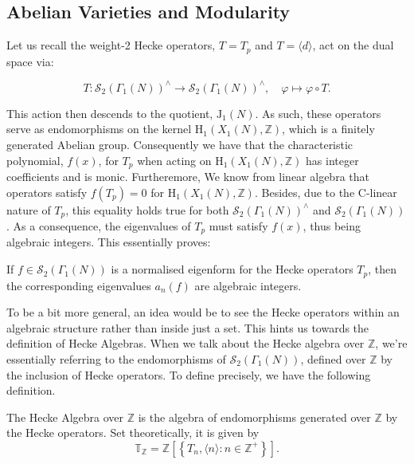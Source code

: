 \subsection{Abelian Varieties and Modularity}

Let us recall the weight-2 Hecke operators, $T=T_{p}$ and $T=\langle d\rangle$, act on the dual space via: 

$$
T: \mathcal{S}_{2}\left(\Gamma_{1}(N)\right)^{\wedge} \longrightarrow \mathcal{S}_{2}\left(\Gamma_{1}(N)\right)^{\wedge}, \quad \varphi \mapsto \varphi \circ T.
$$

This action then descends to the quotient, $\mathrm{J}_{1}(N)$. As such, these operators serve as endomorphisms on the kernel $\mathrm{H}_{1}\left(X_{1}(N), \mathbb{Z}\right)$, which is a finitely generated Abelian group. Consequently we have that the characteristic polynomial, $f(x)$, for $T_{p}$ when acting on $\mathrm{H}_{1}\left(X_{1}(N), \mathbb{Z}\right)$ has integer coefficients and is monic. Furtheremore, We know from linear algebra that operators satisfy $f\left(T_{p}\right)=0$ for $\mathrm{H}_{1}\left(X_{1}(N), \mathbb{Z}\right)$. Besides, due to the C-linear nature of $T_{p}$, this equality holds true for both $\mathcal{S}_{2}\left(\Gamma_{1}(N)\right)^{\wedge}$ and $\mathcal{S}_{2}\left(\Gamma_{1}(N)\right)$.  As a consequence, the eigenvalues of $T_{p}$ must satisfy $f(x)$, thus being algebraic integers. This essentially proves:

\begin{theorem}
    If $f\in \mathcal{S}_{2}\left(\Gamma_{1}(N)\right)$ is a normalised eigenform for the Hecke operators $T_{p}$, then the corresponding eigenvalues $a_{n}(f)$ are algebraic integers.
\end{theorem}

To be a bit more general, an idea would be to see the Hecke operators within an algebraic structure rather than inside just a set. This hints us towards the definition of Hecke Algebras.  When we talk about the Hecke algebra over $\mathbb{Z}$, we're essentially referring to the endomorphisms of $\mathcal{S}_{2}\left(\Gamma_{1}(N)\right)$, defined over $\mathbb{Z}$ by the inclusion of Hecke operators. To define precisely, we have the following definition. 

\begin{definition}
The Hecke Algebra over $\mathbb{Z}$ is the algebra of endomorphisms generated over $\mathbb{Z}$ by the Hecke operators. Set theoretically, it is given by $$
\mathbb{T}_{\mathbb{Z}}=\mathbb{Z}\left[\left\{T_{n},\langle n\rangle: n \in \mathbb{Z}^{+}\right\}\right].
$$     
 \end{definition}

